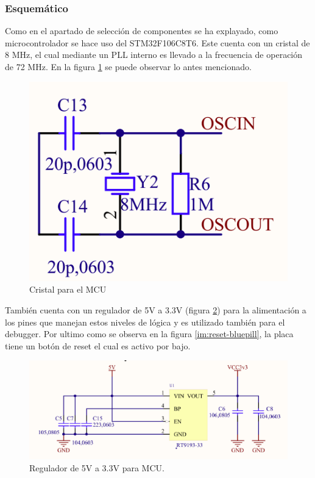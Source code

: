 \subsubsection{Esquemático}
\par Como en el apartado de selección de componentes se ha explayado, como microcontrolador se hace 
uso del STM32F106C8T6. Este 
cuenta con un cristal de 8 MHz, el cual mediante un PLL interno es llevado a la frecuencia de 
operación de 72 MHz. En la
figura \ref{cristal_bluepill} se puede observar lo antes mencionado.

\begin{figure}[!h]
	\centering
	\includegraphics[scale=0.35]{images/central/bluepill-osc.png}
    \caption{Cristal para el MCU}
	\label{cristal_bluepill}
\end{figure}

\par También cuenta con un regulador de 5V a 3.3V (figura \ref{im:reg-bluepill}) para la alimentación
 a los pines que manejan estos niveles de lógica y es utilizado también para el debugger. Por ultimo
  como se observa en la figura \ref{im:reset-bluepill}, la placa tiene un botón de reset el cual es 
  activo por bajo. 

\begin{figure}[!h]
	\centering
	\includegraphics[scale=0.6]{images/central/bluepill-reg.png}
    \caption{Regulador de 5V a 3.3V para MCU.}
	\label{im:reg-bluepill}
\end{figure}

